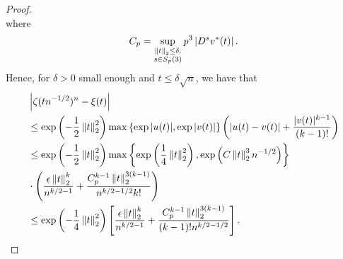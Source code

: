 \begin{proof}
\begin{equation*}
    \end{equation*}
    where
    \begin{equation*}
        C_p = \sup_{\substack{\left\lVert t\right\rVert_2 \leq \delta, \\ s \in S_p(3)}} p^3\left| D^sv^*(t) \right|.
    \end{equation*}
    Hence, for $\delta > 0$ small enough and $t \leq \delta\sqrt{n}$, we have that
    \begin{align*}
        &\left|\zeta(t n^{-1/2})^n - \xi(t)\right| \\
        &\leq \exp\left(-\frac{1}{2}\left\lVert t\right\rVert_2^2\right) \max \left\{ \exp{|u(t)|}, \exp{|v(t)|} \right\}\left(\left|u(t) - v(t)\right| + \frac{|v(t)|^{k-1}}{(k-1)!}\right)\\
        &\leq \exp\left(-\frac{1}{2}\left\lVert t\right\rVert_2^2\right)
            \max \left\{ 
                \exp\left(\frac{1}{4}\left\lVert t\right\rVert_2^2\right),
                \exp\left(C \left\lVert t\right\rVert_2^3 n^{-1/2}\right)
            \right\}\\
        & \cdot \left(
                \frac{\epsilon\left\lVert t\right\rVert_2^k}{n^{k/2-1}}
                +
                \frac{C_p^{k-1} \left\lVert t\right\rVert_2^{3(k-1)} }{n^{k/2-1/2} k!}
              \right)\\
        & \leq \exp\left(-\frac{1}{4}\left\lVert t\right\rVert_2^2\right)\left[ \frac{\epsilon\left\lVert t\right\rVert_2^k}{n^{k/2-1}} + \frac{C_p^{k-1}\left\lVert t\right\rVert_2^{3(k-1)}}{(k-1)!n^{k/2-1/2}} \right]. \qedhere
    \end{align*}
\end{proof}
